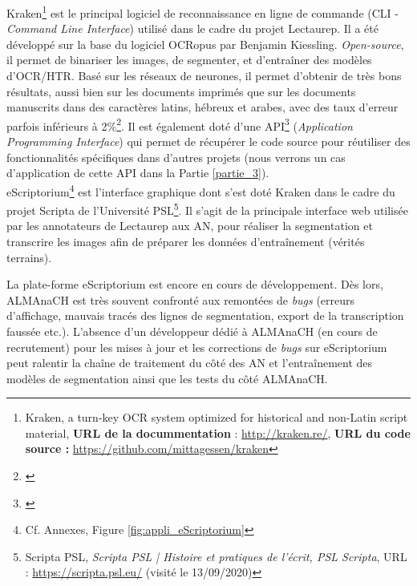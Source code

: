 Kraken\footnote{Kraken, a turn-key OCR system optimized for historical and non-Latin script material, \textbf{URL de la docummentation} : \url{http://kraken.re/}, \textbf{URL du code source :} \url{https://github.com/mittagessen/kraken}} est le principal logiciel de reconnaissance en ligne de commande (CLI -\textit{Command Line Interface}) utilisé dans le cadre du projet Lectaurep. Il a été développé sur la base du logiciel OCRopus par Benjamin Kiessling. \textit{Open-source}, il permet de binariser les images, de segmenter, et d'entraîner des modèles d'OCR/HTR. Basé sur les réseaux de neurones, il permet d'obtenir de très bons résultats, aussi bien sur les documents imprimés que sur les documents manuscrits dans des caractères latins, hébreux et arabes, avec des taux d'erreur parfois inférieurs à 2\%\footnote{\cite{kiessling_important_nodate}}. Il est également doté d'une API\footnote{\cite{noauthor_kraken_nodate}} (\textit{Application Programming Interface}) qui permet de récupérer le code source pour réutiliser des fonctionnalités spécifiques dans d'autres projets (nous verrons un cas d'application de cette API dans la Partie \ref{partie_3}).\\

eScriptorium\footnote{Cf. Annexes, Figure \ref{fig:appli_eScriptorium}} est l'interface graphique dont s'est doté Kraken dans le cadre du projet Scripta de l'Université PSL\footnote{Scripta PSL, \textit{Scripta PSL | Histoire et pratiques de l’écrit, PSL Scripta}, URL : \url{https://scripta.psl.eu/} (visité le 13/09/2020)}. Il s'agit de la principale interface web utilisée par les annotateurs de Lectaurep aux AN, pour réaliser la segmentation et transcrire les images afin de préparer les données d'entraînement (vérités terrains).

La plate-forme eScriptorium est encore en cours de développement. Dès lors, ALMAnaCH est très souvent confronté aux remontées de \textit{bugs} (erreurs d'affichage, mauvais tracés des lignes de segmentation, export de la transcription faussée etc.). L'absence d'un développeur dédié à ALMAnaCH (en cours de recrutement) pour les mises à jour et les corrections de \textit{bugs} sur eScriptorium peut ralentir la chaîne de traitement du côté des AN et l'entraînement des modèles de segmentation ainsi que les tests du côté ALMAnaCH. \\


